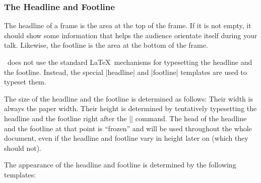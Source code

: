\subsubsection{The Headline and Footline}

The headline of a frame is the area at the top of the frame. If it is
not empty, it should show some information that helps the audience
orientate itself during your talk. Likewise, the footline is the area
at the bottom of the frame.

\beamer\ does not use the standard \LaTeX\ mechanisms for typesetting
the headline and the footline. Instead, the special |headline| and
|footline| templates are used to typeset them.

The size of the headline and the footline is determined as follows:
Their width is always the paper width. Their height is determined by
tentatively typesetting the headline and the footline right after the
|| command. The head of the headline and the footline
at that point is ``frozen'' and will be used throughout the whole
document, even if the headline and footline vary in height later on
(which they should not).

The appearance of the headline and footline is determined by the
following templates:

